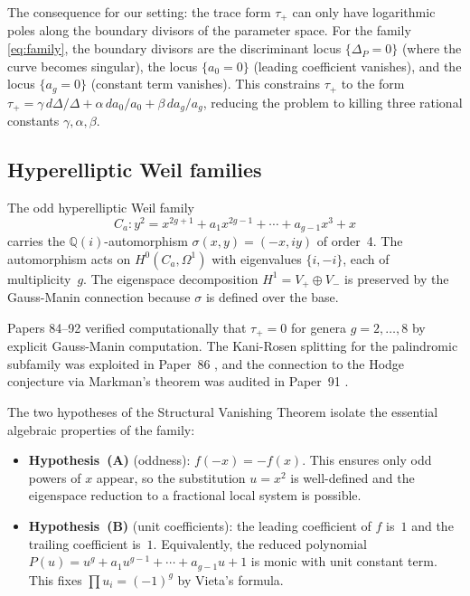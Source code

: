 \documentclass[11pt]{article}
\theoremstyle{plain}
\theoremstyle{definition}
\theoremstyle{remark}
\newcommand{\QQ}{\mathbb{Q}}
\begin{document}
The consequence for our setting: the trace form $\tau_+$ can only have
logarithmic poles along the boundary divisors of the parameter space.
For the family \eqref{eq:family}, the boundary divisors are the discriminant
locus $\{\Delta_P = 0\}$ (where the curve becomes singular), the locus
$\{a_0 = 0\}$ (leading coefficient vanishes), and the locus $\{a_g = 0\}$
(constant term vanishes).  This constrains $\tau_+$ to the form
$\tau_+ = \gamma\,d\Delta/\Delta + \alpha\,da_0/a_0 + \beta\,da_g/a_g$,
reducing the problem to killing three rational constants $\gamma, \alpha, \beta$.

\subsection{Hyperelliptic Weil families}\label{subsec:weil-families}

The odd hyperelliptic Weil family \cite{griffiths,kani-rosen,zarhin}
\begin{equation}\label{eq:family-prelim}
  C_a : y^2 = x^{2g+1} + a_1 x^{2g-1} + \cdots + a_{g-1} x^3 + x
\end{equation}
carries the $\QQ(i)$-automorphism $\sigma(x,y) = (-x, iy)$ of order~4.
The automorphism acts on $H^0(C_a, \Omega^1)$ with eigenvalues $\{i, -i\}$,
each of multiplicity~$g$.  The eigenspace decomposition $H^1 = V_+ \oplus V_-$
is preserved by the Gauss-Manin connection because $\sigma$ is defined over
the base.

Papers 84--92 \cite{p84,p85,p89,p92} verified computationally that
$\tau_+ = 0$ for genera $g = 2, \ldots, 8$ by explicit Gauss-Manin
computation.  The Kani-Rosen splitting \cite{kani-rosen} for the
palindromic subfamily was exploited in Paper~86 \cite{p86}, and the
connection to the Hodge conjecture via Markman's theorem \cite{markman}
was audited in Paper~91 \cite{p91}.

The two hypotheses of the Structural Vanishing Theorem isolate the
essential algebraic properties of the family:
\begin{itemize}
\item \textbf{Hypothesis~(A)} (oddness): $f(-x) = -f(x)$.  This ensures
  only odd powers of $x$ appear, so the substitution $u = x^2$ is
  well-defined and the eigenspace reduction to a fractional local system
  is possible.
\item \textbf{Hypothesis~(B)} (unit coefficients): the leading coefficient of
  $f$ is~$1$ and the trailing coefficient is~$1$.  Equivalently, the reduced
  polynomial $P(u) = u^g + a_1 u^{g-1} + \cdots + a_{g-1}u + 1$ is monic
  with unit constant term.  This fixes $\prod u_i = (-1)^g$ by Vieta's formula.
\end{itemize}
\end{document}
